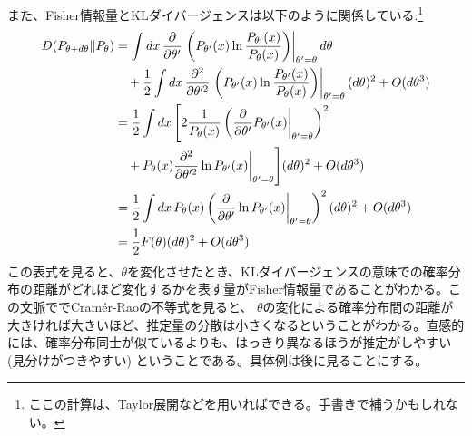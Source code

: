 \documentclass[a4paper,11pt]{jsarticle}
\numberwithin{equation}{section}
\begin{document}
また、Fisher情報量とKLダイバージェンスは以下のように関係している:\footnote{ここの計算は、Taylor展開などを用いればできる。手書きで補うかもしれない。}
\begin{align}
    D(P_{\theta + d\theta} \| P_{\theta})
    &= \int dx \, \pdv{}{\theta'} \left.\left( P_{\theta'}(x) \ln \frac{P_{\theta'}(x)}{P_{\theta}(x)} \right)\right|_{\theta' = \theta} d\theta \notag \\
    &\quad + \frac{1}{2} \int dx \, \frac{\partial^2}{\partial \theta'^2} \left.\left( P_{\theta'}(x) \ln \frac{P_{\theta'}(x)}{P_{\theta}(x)} \right)\right|_{\theta' = \theta} (d\theta)^2 + O(d\theta^3) \notag \\
    &= \frac{1}{2} \int dx \, \Bigg[ 2 \frac{1}{P_{\theta}(x)} \left( \pdv{}{\theta'} P_{\theta'}(x) \bigg|_{\theta' = \theta} \right)^2 \notag \\
    &\quad + P_{\theta}(x) \frac{\partial^2}{\partial \theta'^2} \ln P_{\theta'}(x) \bigg|_{\theta' = \theta} \Bigg] (d\theta)^2 + O(d\theta^3) \notag \\
    &= \frac{1}{2} \int dx \, P_{\theta}(x) \left( \pdv{}{\theta'} \ln P_{\theta'}(x) \bigg|_{\theta' = \theta} \right)^2 (d\theta)^2 + O(d\theta^3)\\
    &= \frac{1}{2} F(\theta) (d\theta)^2 + O(d\theta^3)
\end{align}
この表式を見ると、$\theta$を変化させたとき、KLダイバージェンスの意味での確率分布の距離がどれほど変化するかを表す量がFisher情報量であることがわかる。この文脈ででCram\'er-Raoの不等式を見ると、
$\theta$の変化による確率分布間の距離が大きければ大きいほど、推定量の分散は小さくなるということがわかる。直感的には、確率分布同士が似ているよりも、はっきり異なるほうが推定がしやすい(見分けがつきやすい)
ということである。具体例は後に見ることにする。\\
\end{document}
